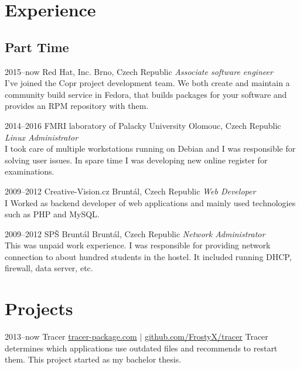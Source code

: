 \documentclass[]{friggeri-cv}
\begin{document}
\section{Experience}
\subsection{Part Time}
\begin{entrylist}

\entry
{2015--now}
{Red Hat, Inc.}
{Brno, Czech Republic}
{\emph{Associate software engineer} \\
I've joined the Copr project development team. We both create and maintain a community build service in Fedora, that builds packages for your software and provides an RPM repository with them.}

\entry
{2014--2016}
{FMRI laboratory of Palacky University}
{Olomouc, Czech Republic}
{\emph{Linux Administrator} \\
I took care of multiple workstations running on Debian and I was responsible for solving user issues. In spare time I was developing new online register for examinations.}

\entry
{2009--2012}
{Creative-Vision.cz}
{Bruntál, Czech Republic}
{\emph{Web Developer} \\
I Worked as backend developer of web applications and mainly used technologies such as PHP and MySQL.}

\entry
{2009--2012}
{SPŠ Bruntál}
{Bruntál, Czech Republic}
{\emph{Network Administrator} \\
This was unpaid work experience. I was responsible for providing network connection to about hundred students in the hostel. It included running DHCP, firewall, data server, etc.}

\end{entrylist}


\section{Projects}

\begin{entrylist}

\entry
{2013--now}
{Tracer}
{\href{http://tracer-package.com}{tracer-package.com} | \href{https://github.com/FrostyX/tracer}{github.com/FrostyX/tracer}}
{Tracer determines which applications use outdated files and recommends to restart them. This project started as my bachelor thesis.}

\end{entrylist}
\end{document}
